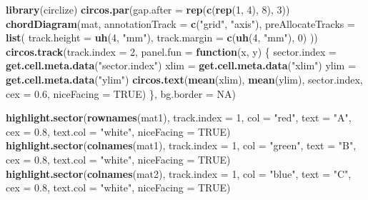 \documentclass[]{book}
\newenvironment{Shaded}{\begin{snugshade}}{\end{snugshade}}
\newcommand{\KeywordTok}[1]{\textcolor[rgb]{0.13,0.29,0.53}{\textbf{#1}}}
\newcommand{\DataTypeTok}[1]{\textcolor[rgb]{0.13,0.29,0.53}{#1}}
\newcommand{\DecValTok}[1]{\textcolor[rgb]{0.00,0.00,0.81}{#1}}
\newcommand{\FloatTok}[1]{\textcolor[rgb]{0.00,0.00,0.81}{#1}}
\newcommand{\StringTok}[1]{\textcolor[rgb]{0.31,0.60,0.02}{#1}}
\newcommand{\OtherTok}[1]{\textcolor[rgb]{0.56,0.35,0.01}{#1}}
\newcommand{\ControlFlowTok}[1]{\textcolor[rgb]{0.13,0.29,0.53}{\textbf{#1}}}
\newcommand{\NormalTok}[1]{#1}
\theoremstyle{definition}
\theoremstyle{definition}
\theoremstyle{remark}
\begin{document}
\begin{Shaded}
\begin{Highlighting}[]
\KeywordTok{library}\NormalTok{(circlize)}
\KeywordTok{circos.par}\NormalTok{(}\DataTypeTok{gap.after =} \KeywordTok{rep}\NormalTok{(}\KeywordTok{c}\NormalTok{(}\KeywordTok{rep}\NormalTok{(}\DecValTok{1}\NormalTok{, }\DecValTok{4}\NormalTok{), }\DecValTok{8}\NormalTok{), }\DecValTok{3}\NormalTok{))}
\KeywordTok{chordDiagram}\NormalTok{(mat, }\DataTypeTok{annotationTrack =} \KeywordTok{c}\NormalTok{(}\StringTok{"grid"}\NormalTok{, }\StringTok{"axis"}\NormalTok{),}
    \DataTypeTok{preAllocateTracks =} \KeywordTok{list}\NormalTok{(}
        \DataTypeTok{track.height =} \KeywordTok{uh}\NormalTok{(}\DecValTok{4}\NormalTok{, }\StringTok{"mm"}\NormalTok{),}
        \DataTypeTok{track.margin =} \KeywordTok{c}\NormalTok{(}\KeywordTok{uh}\NormalTok{(}\DecValTok{4}\NormalTok{, }\StringTok{"mm"}\NormalTok{), }\DecValTok{0}\NormalTok{)}
\NormalTok{))}
\KeywordTok{circos.track}\NormalTok{(}\DataTypeTok{track.index =} \DecValTok{2}\NormalTok{, }\DataTypeTok{panel.fun =} \ControlFlowTok{function}\NormalTok{(x, y) \{}
\NormalTok{    sector.index =}\StringTok{ }\KeywordTok{get.cell.meta.data}\NormalTok{(}\StringTok{"sector.index"}\NormalTok{)}
\NormalTok{    xlim =}\StringTok{ }\KeywordTok{get.cell.meta.data}\NormalTok{(}\StringTok{"xlim"}\NormalTok{)}
\NormalTok{    ylim =}\StringTok{ }\KeywordTok{get.cell.meta.data}\NormalTok{(}\StringTok{"ylim"}\NormalTok{)}
    \KeywordTok{circos.text}\NormalTok{(}\KeywordTok{mean}\NormalTok{(xlim), }\KeywordTok{mean}\NormalTok{(ylim), sector.index, }\DataTypeTok{cex =} \FloatTok{0.6}\NormalTok{, }\DataTypeTok{niceFacing =} \OtherTok{TRUE}\NormalTok{)}
\NormalTok{\}, }\DataTypeTok{bg.border =} \OtherTok{NA}\NormalTok{)}

\KeywordTok{highlight.sector}\NormalTok{(}\KeywordTok{rownames}\NormalTok{(mat1), }\DataTypeTok{track.index =} \DecValTok{1}\NormalTok{, }\DataTypeTok{col =} \StringTok{"red"}\NormalTok{, }
    \DataTypeTok{text =} \StringTok{"A"}\NormalTok{, }\DataTypeTok{cex =} \FloatTok{0.8}\NormalTok{, }\DataTypeTok{text.col =} \StringTok{"white"}\NormalTok{, }\DataTypeTok{niceFacing =} \OtherTok{TRUE}\NormalTok{)}
\KeywordTok{highlight.sector}\NormalTok{(}\KeywordTok{colnames}\NormalTok{(mat1), }\DataTypeTok{track.index =} \DecValTok{1}\NormalTok{, }\DataTypeTok{col =} \StringTok{"green"}\NormalTok{, }
    \DataTypeTok{text =} \StringTok{"B"}\NormalTok{, }\DataTypeTok{cex =} \FloatTok{0.8}\NormalTok{, }\DataTypeTok{text.col =} \StringTok{"white"}\NormalTok{, }\DataTypeTok{niceFacing =} \OtherTok{TRUE}\NormalTok{)}
\KeywordTok{highlight.sector}\NormalTok{(}\KeywordTok{colnames}\NormalTok{(mat2), }\DataTypeTok{track.index =} \DecValTok{1}\NormalTok{, }\DataTypeTok{col =} \StringTok{"blue"}\NormalTok{, }
    \DataTypeTok{text =} \StringTok{"C"}\NormalTok{, }\DataTypeTok{cex =} \FloatTok{0.8}\NormalTok{, }\DataTypeTok{text.col =} \StringTok{"white"}\NormalTok{, }\DataTypeTok{niceFacing =} \OtherTok{TRUE}\NormalTok{)}
\end{Highlighting}
\end{Shaded}
\end{document}
